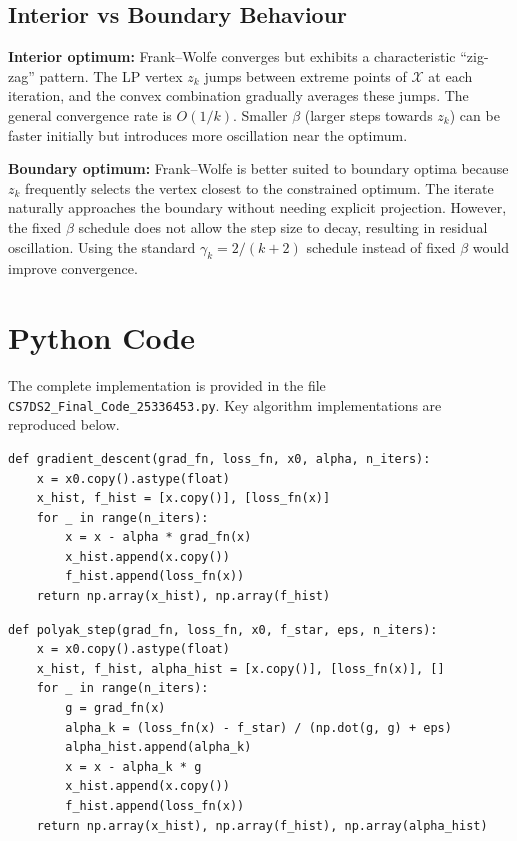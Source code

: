 \documentclass[11pt,a4paper]{article}
\begin{document}
\subsection{Interior vs Boundary Behaviour}

\textbf{Interior optimum:} Frank--Wolfe converges but exhibits a characteristic ``zig-zag'' pattern. The LP vertex $z_k$ jumps between extreme points of $\mathcal{X}$ at each iteration, and the convex combination gradually averages these jumps. The general convergence rate is $O(1/k)$. Smaller $\beta$ (larger steps towards $z_k$) can be faster initially but introduces more oscillation near the optimum.

\textbf{Boundary optimum:} Frank--Wolfe is better suited to boundary optima because $z_k$ frequently selects the vertex closest to the constrained optimum. The iterate naturally approaches the boundary without needing explicit projection. However, the fixed $\beta$ schedule does not allow the step size to decay, resulting in residual oscillation. Using the standard $\gamma_k = 2/(k+2)$ schedule instead of fixed $\beta$ would improve convergence.

\newpage
\appendix
\section{Python Code}
\label{app:code}

The complete implementation is provided in the file \texttt{CS7DS2\_Final\_Code\_25336453.py}. Key algorithm implementations are reproduced below.

\begin{lstlisting}[caption={Gradient Descent}]
def gradient_descent(grad_fn, loss_fn, x0, alpha, n_iters):
    x = x0.copy().astype(float)
    x_hist, f_hist = [x.copy()], [loss_fn(x)]
    for _ in range(n_iters):
        x = x - alpha * grad_fn(x)
        x_hist.append(x.copy())
        f_hist.append(loss_fn(x))
    return np.array(x_hist), np.array(f_hist)
\end{lstlisting}

\begin{lstlisting}[caption={Polyak Step Size}]
def polyak_step(grad_fn, loss_fn, x0, f_star, eps, n_iters):
    x = x0.copy().astype(float)
    x_hist, f_hist, alpha_hist = [x.copy()], [loss_fn(x)], []
    for _ in range(n_iters):
        g = grad_fn(x)
        alpha_k = (loss_fn(x) - f_star) / (np.dot(g, g) + eps)
        alpha_hist.append(alpha_k)
        x = x - alpha_k * g
        x_hist.append(x.copy())
        f_hist.append(loss_fn(x))
    return np.array(x_hist), np.array(f_hist), np.array(alpha_hist)
\end{lstlisting}
\end{document}
